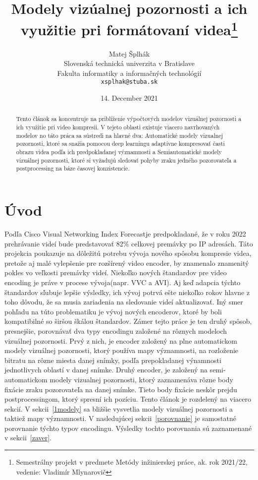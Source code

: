 \documentclass[10pt,twoside,slovak,a4paper]{article}
\title{Modely vizúalnej pozornosti a ich využitie pri formátovaní videa\thanks{Semestrálny projekt v predmete Metódy inžinierskej práce, ak. rok 2021/22, vedenie: Vladimír Mlynarovič}} %
\author{Matej Šplhák\\[2pt]
	{\small Slovenská technická univerzita v Bratislave}\\
	{\small Fakulta informatiky a informačných technológií}\\
	{\small \texttt{xsplhak@stuba.sk}}
	}
\date{\small 14. December 2021} %
\begin{document}
\maketitle
\begin{abstract}
Tento článok sa koncentruje na priblíženie výpočtových modelov vizuálnej pozornosti a ich využitie pri video kompresii. V tejeto oblasti existuje viacero navrhovaných modelov no táto práca sa sústredi na hlavné dva: Automatické modely vizualnej pozornosti, ktoré sa snažia pomocou deep learningu adaptívne kompresovať časti obrazu videa podľa ich predpokladanej významnosti a Semiautomatické modely vizuálnej pozornosti, ktoré  si vyžadujú sledovať pohyby zraku jedného pozorovateľa a postprocessing na báze časovej konzistencie. 
\end{abstract}


\section{Úvod}
Podľa Cisco  Visual  Networking  Index  Forecast\cite{cisco:forecast}je predpokladané, že v roku 2022 prehrávanie videí bude predstavovať 82\% celkovej premávky po IP adresách. Táto projekcia poukazuje na dôležitú potrebu vývoja nového spôsobu kompresie videa, pretože aj malé vylepšenie pre rozšírený video encoder, by znamenalo znamenitý pokles vo veľkosti premávky videí. Niekoľko nových štandardov pre video encoding je práve v procese vývoja(napr. VVC a AVI). Aj keď adapcia týchto štandardov sľubuje lepšie výsledky, ich vývoj potrvá ešte niekoľko rokov hlavne z toho dôvodu, že sa musia zariadenia na sledovanie videí aktualizovať. Iný smer pohľadu na túto problematiku je vývoj nových encoderov, ktoré by boli kompatibilné so širšou škálou štandardov. Zámer tejto práce je ten druhý spôsob, presnejšie, porovnávať dva typy encodingu založené na rôznych modeloch vizuálnej pozornosti. Prvý z nich\cite{Czarnecki:Progress}, je encoder založený na plne automatickom modely vizuálnej pozornosti, ktorý používa mapy významnosti, na rozloženie bitratu na rôzne miesta danej snímky, podľa prepokladanej výnamnosti jednotlivych oblastí v danej snímke. Druhý encoder\cite{Coplien:MPD}, je založený na semi-automatickom modely vizualnej pozornosti, ktorý zaznamenáva rôzne body fixácie zraku pozorovateľa na danej snímke. Tieto body fixácie neskôr prejdu postprocessingom, ktorý spresní ich pozíciu. Tento článok je rozdelený na viacero sekcií. V sekcii~\ref{1modely} sa bližšie vysvetlia modely vizuálnej pozornosti a taktiež mapy významnosti. V nasledujúcej sekcii~\ref{porovnanie} je samostatné porovnanie týchto typov encodingu. Výsledky tochto porovnania sú zaznamenané v sekcii~\ref{zaver}.   
\end{document}
